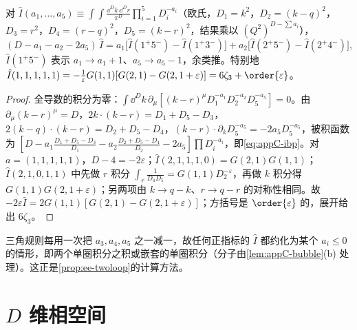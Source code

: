 \begin{lemma}\label{lem:appC-ibp}
对 $\hat I(a_1,\dots,a_5)\equiv\int\!\!\int\frac{\dd^Dk\,\dd^Dr}{\pi^D}\prod_{i=1}^5D_i^{-a_i}$（欧氏，$D_1=k^2$，$D_2=(k-q)^2$，$D_3=r^2$，$D_4=(r-q)^2$，$D_5=(k-r)^2$，结果乘以 $(Q^2)^{D-\sum a_i}$），
\begin{equation}\label{eq:appC-ibp}
(D-a_1-a_2-2a_5)\,\hat I=a_1\big[\hat I(1^+5^-)-\hat I(1^+3^-)\big]+a_2\big[\hat I(2^+5^-)-\hat I(2^+4^-)\big],
\end{equation}
$\hat I(1^+5^-)$ 表示 $a_1\to a_1+1$、$a_5\to a_5-1$，余类推。特别地 $\hat I(1,1,1,1,1)=-\frac1\varepsilon G(1,1)[G(2,1)-G(2,1+\varepsilon)]=6\zeta_3+\order{\varepsilon}$。
\end{lemma}
\begin{proof}
全导数的积分为零：$\int\dd^Dk\,\partial_\mu[(k-r)^\mu D_1^{-a_1}D_2^{-a_2}D_5^{-a_5}]=0$。由 $\partial_\mu(k-r)^\mu=D$，$2k\cdot(k-r)=D_1+D_5-D_3$，$2(k-q)\cdot(k-r)=D_2+D_5-D_4$，$(k-r)\cdot\partial_kD_5^{-a_5}=-2a_5D_5^{-a_5}$，被积函数为 $[D-a_1\frac{D_1+D_5-D_3}{D_1}-a_2\frac{D_2+D_5-D_4}{D_2}-2a_5]\prod D_i^{-a_i}$，即\cref{eq:appC-ibp}。对 $a=(1,1,1,1,1)$，$D-4=-2\varepsilon$；$\hat I(2,1,1,1,0)=G(2,1)G(1,1)$；$\hat I(2,1,0,1,1)$ 中先做 $r$ 积分 $\int_r\frac1{D_4D_5}=G(1,1)D_2^{-\varepsilon}$，再做 $k$ 积分得 $G(1,1)G(2,1+\varepsilon)$；另两项由 $k\to q-k$、$r\to q-r$ 的对称性相同。故 $-2\varepsilon\hat I=2G(1,1)[G(2,1)-G(2,1+\varepsilon)]$；方括号是 $\order{\varepsilon}$ 的，展开给出 $6\zeta_3$\cite{ChetyrkinTkachov1981,Tkachov1981}。
\end{proof}
三角规则每用一次把 $a_3,a_4,a_5$ 之一减一，故任何正指标的 $\hat I$ 都约化为某个 $a_i\le0$ 的情形，即两个单圈积分之积或嵌套的单圈积分（分子由\cref{lem:appC-bubble}(b) 处理）。这正是\cref{prop:ee-twoloop}的计算方法。

\section{$D$ 维相空间}\label{sec:appC-phase-space}

